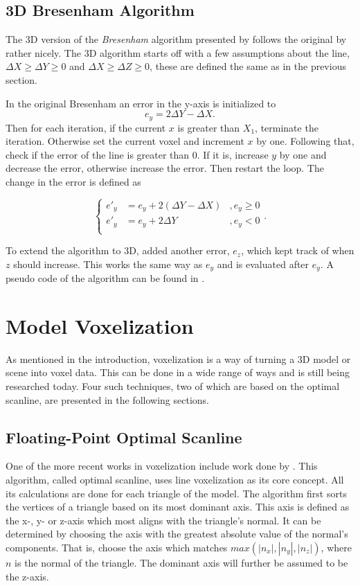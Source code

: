\subsection{3D Bresenham Algorithm}
The 3D version of the \textit{Bresenham} algorithm presented by  follows the original by  rather nicely.
The 3D algorithm starts off with a few assumptions about the line,
$\Delta X \ge \Delta Y \ge 0$ and $\Delta X \ge \Delta Z \ge 0$, these are defined the same as in the previous section.

In the original Bresenham an error in the y-axis is initialized to
$$e_y = 2 \Delta Y - \Delta X.$$
Then for each iteration, if the current $x$ is greater than $X_1$, terminate the iteration.
Otherwise set the current voxel and increment $x$ by one.
Following that, check if the error of the line is greater than 0.
If it is, increase $y$ by one and decrease the error, otherwise increase the error.
Then restart the loop.
The change in the error is defined as

\begin{equation*}
\left\{
\begin{aligned}
  e'_y &= e_y + 2 (\Delta Y - \Delta X) &, e_y \ge 0\\
  e'_y &= e_y + 2 \Delta Y &, e_y < 0 \\
\end{aligned}
\right.
.
\end{equation*}

To extend the algorithm to 3D, \citeauthor{3d-bresenham} added another error, $e_z$, which kept track of when $z$ should increase.
This works the same way as $e_y$ and is evaluated after $e_y$.
A pseudo code of the algorithm can be found in .

\section{Model Voxelization}
As mentioned in the introduction, voxelization is a way of turning a 3D model or scene into voxel data.
This can be done in a wide range of ways and is still being researched today.
Four such techniques, two of which are based on the optimal scanline, are presented in the following sections.

\subsection{Floating-Point Optimal Scanline}\label{sss:vox_optscan}
One of the more recent works in voxelization include work done by .
This algorithm, called optimal scanline, uses line voxelization as its core concept.
All its calculations are done for each triangle of the model.
The algorithm first sorts the vertices of a triangle based on its most dominant axis.
This axis is defined as the x-, y- or z-axis which most aligns with the triangle's normal.
It can be determined by choosing the axis with the greatest absolute value of the normal's components.
That is, choose the axis which matches $max(|n_x|, |n_y|, |n_z|)$, where $n$ is the normal of the triangle.
The dominant axis will further be assumed to be the z-axis.


